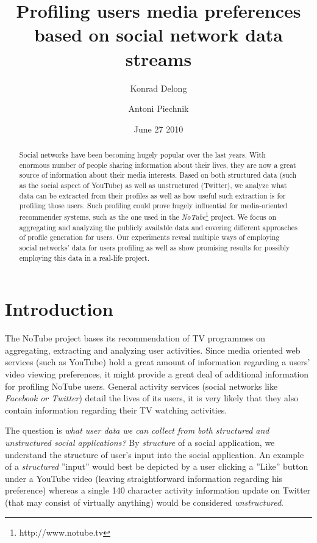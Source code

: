 \documentclass{article}
\begin{document}
\title{\textbf{Profiling users media preferences based on social network data streams}}
\author{Konrad Delong \and Antoni Piechnik}
\date{June 27 2010}

\maketitle

\begin{abstract} Social networks have been becoming hugely popular over the last
years. With enormous number of people sharing information about their lives,
they are now a great source of information about their media interests. Based on both
structured data (such as the social aspect of YouTube) as well as unstructured
(Twitter), we analyze what data can be extracted from their profiles as well as
how useful such extraction is for profiling those users. Such profiling could
prove hugely influential for media-oriented recommender systems, such as the one
used in the \textit{NoTube}\footnote[1]{http://www.notube.tv} project.
We focus on aggregating and analyzing the publicly available data and covering
different approaches of profile generation
for users. Our experiments reveal multiple ways of employing social networks'
data for users profiling as well as show promising results for possibly employing
this data in a real-life project.
\end{abstract}

\section{Introduction}

The NoTube project bases its recommendation of TV programmes on aggregating, extracting and analyzing user activities. Since media oriented web services (such as YouTube) hold a great amount of information regarding a users' video viewing preferences, it might provide a great deal of additional information for profiling NoTube users. General activity services (social networks like \textit{Facebook or Twitter}) detail the lives of its users, it is very likely that they also contain information regarding their TV watching activities.

The question is \textit{what user data we can collect from both structured and unstructured social applications?} By \textit{structure} of a social application, we understand the structure of user's input into the social application. An example of a \textit{structured} ''input'' would best be depicted by a user clicking a ''Like'' button under a YouTube video (leaving straightforward information regarding his preference)
whereas a single 140 character activity information update on Twitter (that may consist of virtually anything) would be considered \textit{unstructured}.
\end{document}

